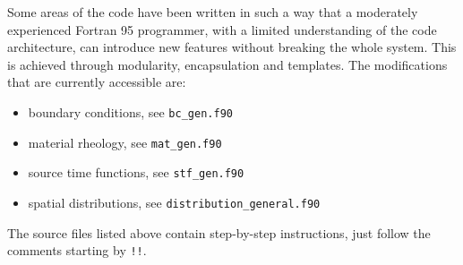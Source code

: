 Some areas of the code have been written in such a way that a moderately 
experienced Fortran 95 programmer,
with a limited understanding of the code architecture,
can introduce new features without breaking the whole system.
This is achieved through modularity, encapsulation and templates.
The modifications that are currently accessible are:
\begin{itemize}
  \item boundary conditions, see \texttt{bc\_gen.f90}
  \item material rheology, see \texttt{mat\_gen.f90}
  \item source time functions, see \texttt{stf\_gen.f90}
  \item spatial distributions, see \texttt{distribution\_general.f90}
\end{itemize}
The source files listed above contain step-by-step instructions,
just follow the comments starting by \texttt{!!}.

